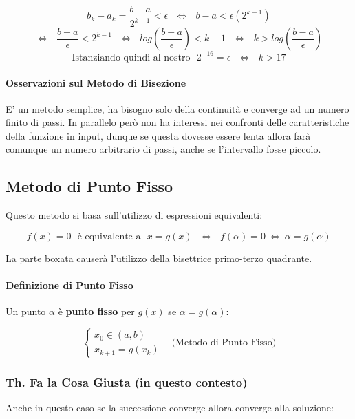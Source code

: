 \documentclass{article}
\begin{document}
\[ b_{k} - a_{k} = \frac{b-a}{2^{k-1}} < \epsilon \:\:\: \Leftrightarrow \:\:\: b-a < \epsilon(2^{k-1}) \]
\[ \Leftrightarrow \:\:\: \frac{b-a}{\epsilon} < 2^{k-1} \:\:\: \Leftrightarrow \:\:\: log(\frac{b-a}{\epsilon}) < k-1 \:\:\:  \Leftrightarrow \:\:\: k > log(\frac{b-a}{\epsilon})\]
\[ \text{Istanziando quindi al nostro} \:\:\: 2^{-16} = \epsilon \:\:\: \Leftrightarrow \:\:\: k > 17 \]

\paragraph{Osservazioni sul Metodo di Bisezione} E' un metodo semplice, ha bisogno solo della continuità e converge ad un numero finito di passi. In parallelo però non ha interessi nei confronti delle caratteristiche della funzione in input, dunque se questa dovesse essere lenta allora farà comunque un numero arbitrario di passi, anche se l'intervallo fosse piccolo.  

\newpage

\subsection{Metodo di Punto Fisso}

Questo metodo si basa sull'utilizzo di espressioni equivalenti:

\[ f(x) = 0 \:\:\: \text{è equivalente a} \:\:\: \boxed{x = g(x)} \:\:\: \Leftrightarrow \:\:\: f(\alpha) = 0 \: \Leftrightarrow \: \alpha = g(\alpha) \]

La parte boxata causerà l'utilizzo della bisettrice primo-terzo quadrante.

\paragraph{Definizione di Punto Fisso} Un punto $\alpha$ è \textbf{punto fisso} per $g(x)$ se $\alpha = g(\alpha)$:

\[ \left\{ \begin{array}{lll}
    x_{0} \in (a,b) \\
    x_{k+1} = g(x_{k})
    \end{array}\right.
    \:\:\:\: \text{(Metodo di Punto Fisso)}
\]

\subsubsection{Th. Fa la Cosa Giusta (in questo contesto)}

Anche in questo caso se la successione converge allora converge alla soluzione:
\end{document}
